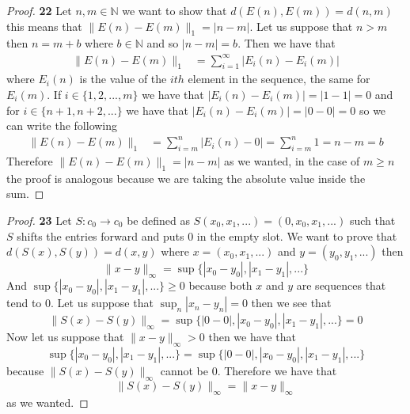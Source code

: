 \documentclass[11pt]{article}
\newcommand{\N}{\mathbb{N}}
\theoremstyle{definition}
\begin{document}
    \begin{proof}{\textbf{22}}
        Let $n,m \in \N$ we want to show that $d(E(n), E(m)) = d(n,m)$ this
        means that $\|E(n) - E(m)\|_1 = |n-m|$. Let us suppose that $n > m$
        then $n = m + b$ where $b \in \N$ and so $|n - m| = b$.
        Then we have that
        \begin{align*}
            \|E(n) - E(m)\|_1 &= \sum_{i=1}^{\infty} |E_i(n) - E_i(m)|
        \end{align*}
        where $E_i(n)$ is the value of the $ith$ element in the sequence, the
        same for $E_i(m)$. If $i \in \{1, 2, ..., m \}$ we have that
        $|E_i(n) - E_i(m)| =  |1 - 1| = 0$ and for $i \in \{n +1, n+2, ...\}$
        we have that $|E_i(n) - E_i(m)| =  |0 - 0| = 0$ so we can write the
        following
        \begin{align*}
            \|E(n) - E(m)\|_1 &= \sum_{i=m}^{n} |E_i(n) - 0|
                = \sum_{i=m}^{n} 1 = n - m = b
        \end{align*}
        Therefore $\|E(n) - E(m)\|_1 = |n-m|$ as we wanted, in the case of
        $m \geq n$ the proof is analogous because we are taking the absolute
        value inside the sum.
    \end{proof}
    \begin{proof}{\textbf{23}}
        Let $S:c_0 \to c_0$ be defined as $S(x_0, x_1, ...) = (0, x_0, x_1, ...)$
        such that $S$ shifts the entries forward and puts $0$ in the empty slot.
        We want to prove that $d(S(x), S(y)) = d(x,y)$ where $x = (x_0, x_1, ...)$
        and $y = (y_0, y_1, ...)$ then
        $$\|x - y\|_\infty = \sup \{|x_0 - y_0|, |x_1 - y_1|, ...\}$$
        And $\sup \{|x_0 - y_0|, |x_1 - y_1|, ...\} \geq 0$ because both $x$
        and $y$ are sequences that tend to $0$. Let us suppose that
        $\sup_n |x_n - y_n| = 0$ then we see that
        $$\|S(x) - S(y)\|_\infty = \sup \{|0 - 0|, |x_0 - y_0|, |x_1 - y_1|, ...\}
        = 0$$
        Now let us suppose that $\|x - y\|_\infty > 0$ then we have that
        $$\sup \{|x_0 - y_0|, |x_1 - y_1|, ...\} = \sup \{|0-0|, |x_0 - y_0|, |x_1 - y_1|, ...\}$$
        because $\|S(x) - S(y)\|_\infty$ cannot be $0$. Therefore we have that
        $$\|S(x)-S(y)\|_\infty = \|x -y\|_\infty$$
        as we wanted.

    \end{proof}
\cleardoublepage
\end{document}
